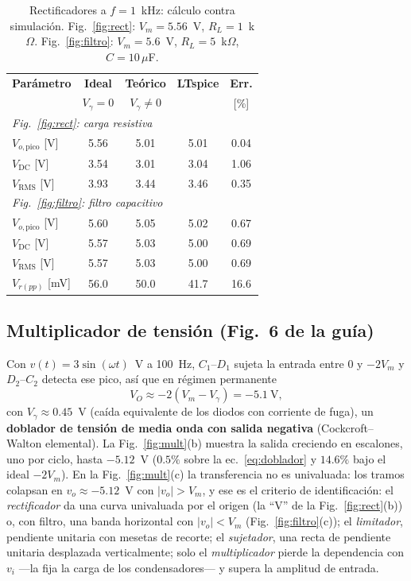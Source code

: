 \documentclass[conference,10pt]{IEEEtran}
\newcommand{\VDC}{V_{\mathrm{DC}}}
\newcommand{\VRMS}{V_{\mathrm{RMS}}}
\newcommand{\Vg}{V_\gamma}
\begin{document}
\begin{table}[htbp]
\caption{Rectificadores a $f=1$~kHz: cálculo contra simulación.
Fig.~\ref{fig:rect}: $V_m=5.56$~V, $R_L=1$~k$\Omega$.
Fig.~\ref{fig:filtro}: $V_m=5.6$~V, $R_L=5$~k$\Omega$,
$C=10\,\mu$F.}
\label{tab:rect}
\centering
\footnotesize
\setlength{\tabcolsep}{3.5pt}
\begin{tabular}{lcccc}
\toprule
\textbf{Parámetro} & \textbf{Ideal} & \textbf{Teórico} & \textbf{LTspice} & \textbf{Err.}\\
 & $\Vg=0$ & $\Vg\neq0$ & & [\%]\\
\midrule
\multicolumn{5}{l}{\textit{Fig.~\ref{fig:rect}: carga resistiva}}\\
$V_{o,\text{pico}}$ [V]  & 5.56 & 5.01 & 5.01 & 0.04\\
$\VDC$ [V]               & 3.54 & 3.01 & 3.04 & 1.06\\
$\VRMS$ [V]              & 3.93 & 3.44 & 3.46 & 0.35\\
\midrule
\multicolumn{5}{l}{\textit{Fig.~\ref{fig:filtro}: filtro capacitivo}}\\
$V_{o,\text{pico}}$ [V]  & 5.60 & 5.05 & 5.02 & 0.67\\
$\VDC$ [V]               & 5.57 & 5.03 & 5.00 & 0.69\\
$\VRMS$ [V]              & 5.57 & 5.03 & 5.00 & 0.69\\
$V_{r(pp)}$ [mV]         & 56.0 & 50.0 & 41.7 & 16.6\\
\bottomrule
\end{tabular}
\end{table}

\subsection{Multiplicador de tensión (Fig.~6 de la guía)}
Con $v(t)=3\sin(\omega t)$~V a 100~Hz, $C_1$--$D_1$ sujeta la entrada
entre $0$ y $-2V_m$ y $D_2$--$C_2$ detecta ese pico, así que en régimen
permanente
\begin{equation}
V_O\approx-2\left(V_m-\Vg\right)=-5.1\ \text{V},
\label{eq:doblador}
\end{equation}
con $\Vg\approx0.45$~V (caída equivalente de los diodos con corriente
de fuga), un \textbf{doblador de tensión de media onda con salida
negativa} (Cockcroft--Walton elemental). La Fig.~\ref{fig:mult}(b)
muestra la salida creciendo en escalones, uno por ciclo, hasta
$-5.12$~V ($0.5\%$ sobre la ec.~\eqref{eq:doblador} y $14.6\%$ bajo el
ideal $-2V_m$). En la Fig.~\ref{fig:mult}(c) la transferencia no es
univaluada: los tramos colapsan en $v_o\approx-5.12$~V con
$|v_o|>V_m$, y ese es el criterio de identificación: el
\textit{rectificador} da una curva univaluada por el origen (la ``V''
de la Fig.~\ref{fig:rect}(b)) o, con filtro, una banda horizontal con
$|v_o|<V_m$ (Fig.~\ref{fig:filtro}(c)); el \textit{limitador},
pendiente unitaria con mesetas de recorte; el \textit{sujetador}, una
recta de pendiente unitaria desplazada verticalmente; solo el
\textit{multiplicador} pierde la dependencia con $v_i$ ---la fija la
carga de los condensadores--- y supera la amplitud de entrada.
\end{document}
